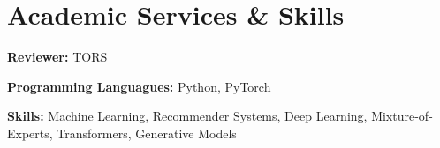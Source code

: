 \documentclass[letterpaper,11pt]{article}
\newcommand{\resumeSubHeadingListStart}{\begin{itemize}[leftmargin=0.15in, label={}]}
\newcommand{\resumeSubHeadingListEnd}{\end{itemize}}
\begin{document}

\section{Academic Services \& Skills}
  \vspace{2pt}
  \resumeSubHeadingListStart
    \small{\item{

        \textbf{Reviewer:}{ TORS } \\ \vspace{3pt}

        \textbf{Programming Languagues:}{ Python, PyTorch} \\ \vspace{3pt}

        \textbf{Skills:}{ Machine Learning, Recommender Systems, Deep Learning, Mixture-of-Experts, Transformers, Generative Models} \\ \vspace{3pt}

    }}
  \resumeSubHeadingListEnd








\end{document}
